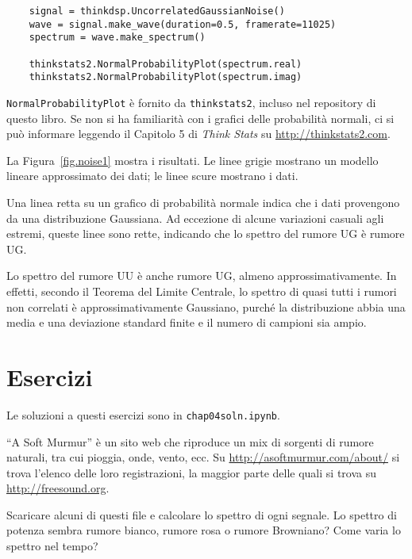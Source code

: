 \documentclass[12pt]{book} \usepackage[width=5.5in,height=8.5in, hmarginratio=3:2,vmarginratio=1:1]{geometry}
\begin{document}
\begin{verbatim} 
    signal = thinkdsp.UncorrelatedGaussianNoise()
    wave = signal.make_wave(duration=0.5, framerate=11025)
    spectrum = wave.make_spectrum()

    thinkstats2.NormalProbabilityPlot(spectrum.real)
    thinkstats2.NormalProbabilityPlot(spectrum.imag)
 \end{verbatim} 

{\tt NormalProbabilityPlot} è fornito da {\tt thinkstats2}, incluso nel repository di questo libro. Se non si ha familiarità con i grafici delle probabilità normali, ci si può informare leggendo il Capitolo 5 di {\it Think Stats} su \url{http://thinkstats2.com}.

La Figura~\ref{fig.noise1} mostra i risultati. Le linee grigie mostrano un modello lineare approssimato dei dati; le linee scure mostrano i dati.

Una linea retta su un grafico di probabilità normale indica che i dati provengono da una distribuzione Gaussiana. Ad eccezione di alcune variazioni casuali agli estremi, queste linee sono rette, indicando che lo spettro del rumore UG è rumore UG.

Lo spettro del rumore UU è anche rumore UG, almeno approssimativamente. In effetti, secondo il Teorema del Limite Centrale, lo spettro di quasi tutti i rumori non correlati è approssimativamente Gaussiano, purché la distribuzione abbia una media e una deviazione standard finite e il numero di campioni sia ampio.

\section{Esercizi} 

Le soluzioni a questi esercizi sono in {\tt chap04soln.ipynb}.

\begin{exercise} ``A Soft Murmur'' è un sito web che riproduce un mix di sorgenti di rumore naturali, tra cui pioggia, onde, vento, ecc. Su \url{http://asoftmurmur.com/about/} si trova l'elenco delle loro registrazioni, la maggior parte delle quali si trova su \url{http://freesound.org}.

Scaricare alcuni di questi file e calcolare lo spettro di ogni segnale. Lo spettro di potenza sembra rumore bianco, rumore rosa o rumore Browniano? Come varia lo spettro nel tempo? \end{exercise} 
\end{document}
